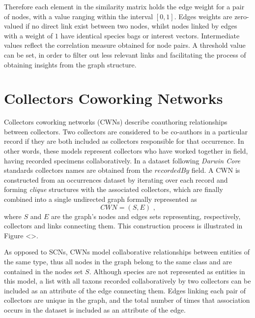 Therefore each element in the similarity matrix holds the edge weight for a pair of nodes, with a value ranging within the interval $[0,1]$. Edges weights are zero-valued if no direct link exist between two nodes,  whilst nodes linked by edges with a weight of $1$ have identical species bags or interest vectors. Intermediate values reflect the correlation measure obtained for node pairs. A threshold value can be set, in order to filter out less relevant links and facilitating the process of obtaining insights from the graph structure.


\section{Collectors Coworking Networks}

Collectors coworking networks (CWNs) describe coauthoring relationships between collectors. Two collectors are considered to be co-authors in a particular record if they are both included as collectors responsible for that occurrence. In other words, these models represent collectors who have worked together in field, having recorded specimens collaboratively.
In a dataset following \textit{Darwin Core} standards collectors names are obtained from the $recordedBy$ field.
A CWN is constructed from an occurrences dataset by iterating over each record and forming \textit{clique} structures with the associated collectors, which are finally combined into a single undirected graph formally represented as 
$$CWN = (S,E) \mbox{ ,}$$
where $S$ and $E$ are the graph's nodes and edges sets representing, respectively, collectors and links connecting them. This construction process is illustrated in Figure <>. %

As opposed to SCNs, CWNs model collaborative relationships between entities of the same type, thus all nodes in the graph belong to the same class and are contained in the nodes set $S$. 
Although species are not represented as entities in this model, a list with all taxons recorded collaboratively by two collectors can be included as an attribute of the edge connecting them.
Edges linking each pair of collectors are unique in the graph, and the total number of times that association occurs in the dataset is included as an attribute of the edge.


